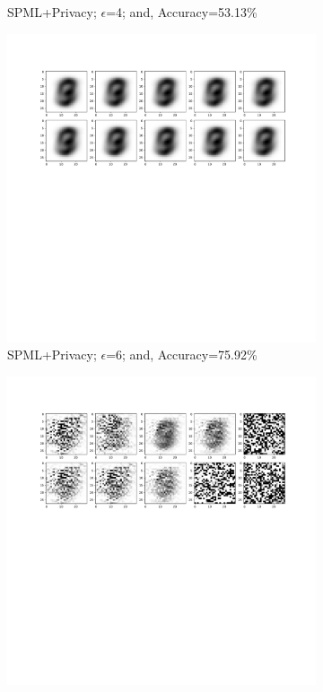 \begin{figure}
\begin{subfigure}{.325\textwidth}
         \vspace{-8em}
         \caption{SPML+Privacy; $\epsilon$=4; and, Accuracy=53.13\%}
         \label{default}
     \end{subfigure}
     \begin{subfigure}{.325\textwidth}
         \includegraphics[width=\textwidth]{images/Hw_attack/Mnistattack6.pdf}
         \vspace{-8em}
         \caption{SPML+Privacy; $\epsilon$=6; and, Accuracy=75.92\%}
         \label{default}
     \end{subfigure}
     \begin{subfigure}{.325\textwidth}
         \includegraphics[width=\textwidth]{images/Hw_attack/Mnistattack8.pdf}

\end{subfigure}
\end{figure}
